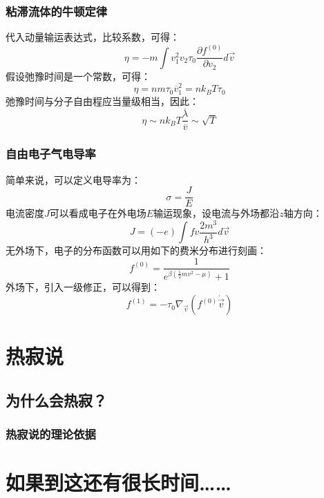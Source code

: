 \documentclass{if-beamer}
\begin{document}
\begin{frame}
    \frametitle{粘滞流体的牛顿定律}
        代入动量输运表达式，比较系数，可得：
        \begin{equation*}
            \eta=-m \int v_{1}^{2} v_{2} \tau_{0} \frac{\partial f^{(0)}}{\partial v_{2}} d \vec{v}
        \end{equation*}
        假设弛豫时间是一个常数，可得：
        \begin{equation*}
            \eta=n m {\tau}_{0} \overline{v}_{1}^{2}=n k_{B} T {\tau}_{0}
        \end{equation*}
        弛豫时间与分子自由程应当量级相当，因此：
        \begin{equation*}
            \eta \sim n k_{B} T \frac{\overline{\lambda}}{\overline{v}}\sim\sqrt{T}
        \end{equation*}

\end{frame}
\begin{frame}
    \frametitle{自由电子气电导率}
        简单来说，可以定义电导率为：
        \begin{equation*}
            \sigma=\frac{J}{E}
        \end{equation*}
        电流密度$J$可以看成电子在外电场$E$输运现象，设电流与外场都沿$z$轴方向：
        \begin{equation*}
            J=(-e) \int f v \frac{2 m^{3}}{h^{3}} d \vec{v}
        \end{equation*}
        无外场下，电子的分布函数可以用如下的费米分布进行刻画：
        \begin{equation*}
            f^{(0)}=\frac{1}{e^{\beta\left(\frac{1}{2} m {v}^{2}-\mu\right)}+1}
        \end{equation*}
        外场下，引入一级修正，可以得到：
        \begin{equation*}
            f^{(1)}=-\tau_{0} \nabla_{\vec{v}}\left(f^{(0)} \dot{\vec{v}}\right)
        \end{equation*}

\end{frame}
\section{热寂说}
\subsection{为什么会热寂？}
\begin{frame}
    \frametitle{热寂说的理论依据}

    

\end{frame}

\section{如果到这还有很长时间……}
\end{document}
